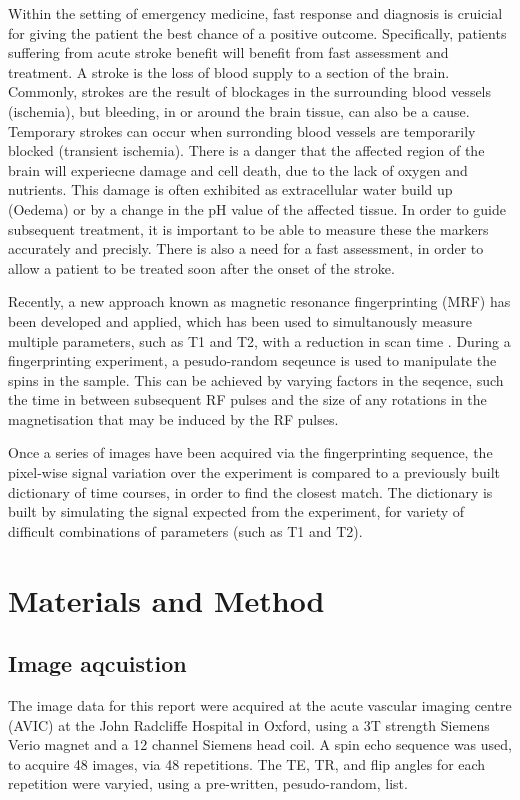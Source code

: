 \documentclass[3p, twocolumn]{elsarticle}
\begin{document}
Within the setting of emergency medicine, fast response and diagnosis is cruicial for giving the patient the best chance of a positive outcome. Specifically, patients suffering from acute stroke benefit will benefit from fast assessment and treatment. A stroke is the loss of blood supply to a section of the brain. Commonly, strokes are the result of blockages in the surrounding blood vessels (ischemia), but bleeding, in or around the brain tissue, can also be a cause. Temporary strokes can occur when surronding blood vessels are temporarily blocked (transient ischemia). There is a danger that the affected region of the brain will experiecne damage and cell death, due to the lack of oxygen and nutrients. This damage is often exhibited as extracellular water build up (Oedema) or by a change in the pH value of the affected tissue. In order to guide subsequent treatment, it is important to be able to measure these the markers accurately and precisly. There is also a need for a fast assessment, in order to allow a patient to be treated soon after the onset of the stroke.

Recently, a new approach known as magnetic resonance fingerprinting (MRF) has been developed and applied, which has been used to simultanously measure multiple parameters, such as T1 and T2, with a reduction in scan time \cite{ma2013magnetic} . During a fingerprinting experiment, a pesudo-random seqeunce is used to manipulate the spins in the sample. This can be achieved by varying factors in the seqence, such the time in between subsequent RF pulses and the size of any rotations in the magnetisation that may be induced by the RF pulses.

Once a series of images have been acquired via the fingerprinting sequence, the pixel-wise signal variation over the experiment is compared to a previously built dictionary of time courses, in order to find the closest match. The dictionary is built by simulating the signal expected from the experiment, for variety of difficult combinations of parameters (such as T1 and T2). 


\section{Materials and Method}

\subsection{Image aqcuistion}
The image data for this report were acquired at the acute vascular imaging centre (AVIC) at the John Radcliffe Hospital in Oxford, using a 3T strength Siemens Verio magnet and a 12 channel Siemens head coil. A spin echo sequence was used, to acquire 48 images, via 48 repetitions. The TE, TR, and flip angles for each repetition were varyied, using a pre-written, pesudo-random, list.
\end{document}
